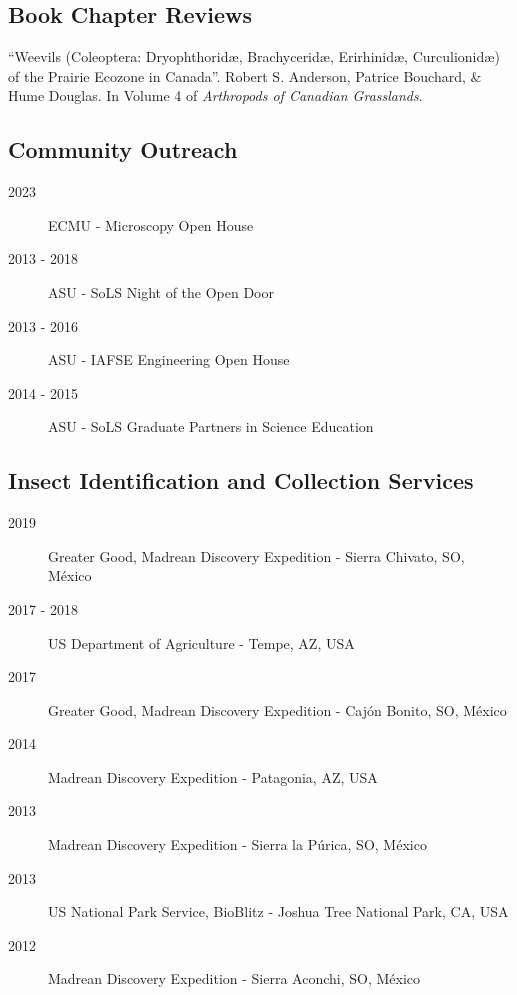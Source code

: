 \documentclass[12pt,a4paper]{article}
\begin{document}
	\subsection*{Book Chapter Reviews}
		\begin{description}
			\item ``Weevils (Coleoptera: Dryophthorid\ae, Brachycerid\ae, Erirhinid\ae, Curculionid\ae) of the Prairie Ecozone in Canada''.
					Robert S. Anderson, Patrice Bouchard, \& Hume Douglas.
					In Volume 4 of \textit{Arthropods of Canadian Grasslands}.
		\end{description}

	\subsection*{Community Outreach}
		\begin{description}
			\item [2023] ECMU - Microscopy Open House
			\item [2013 - 2018] ASU - SoLS Night of the Open Door
			\item [2013 - 2016] ASU - IAFSE Engineering Open House
			\item [2014 - 2015] ASU - SoLS Graduate Partners in Science Education
		\end{description}
		
	\subsection*{Insect Identification and Collection Services}
		\begin{description}
			\item [2019] Greater Good, Madrean Discovery Expedition - Sierra Chivato, SO, M\'{e}xico
			\item [2017 - 2018] US Department of Agriculture - Tempe, AZ, USA
			\item [2017] Greater Good, Madrean Discovery Expedition - Caj\'{o}n Bonito, SO, M\'{e}xico
			\item [2014] Madrean Discovery Expedition - Patagonia, AZ, USA
			\item [2013] Madrean Discovery Expedition - Sierra la P\'{u}rica, SO, M\'{e}xico
			\item [2013] US National Park Service, BioBlitz - Joshua Tree National Park, CA, USA
			\item [2012] Madrean Discovery Expedition - Sierra Aconchi, SO, M\'{e}xico
		\end{description}
\end{document}
